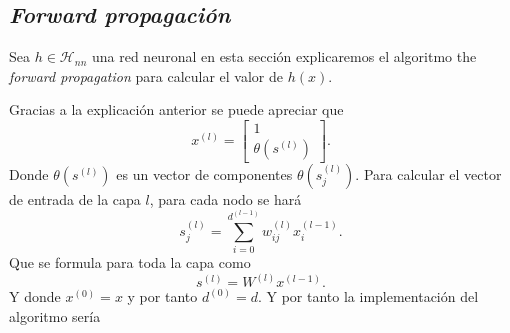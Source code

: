 \subsection{ \textit{Forward propagación}}
Sea $h \in \mathcal{H}_{n n}$ una red neuronal en esta sección explicaremos el algoritmo the \textit{forward propagation} para 
calcular el valor de $h(x).$

Gracias a la explicación anterior se puede apreciar que 
\begin{equation}
    x^{(l)} = 
    \left[ \begin{array}{c}
        1 \\
       \theta(s^{(l)})
        \end{array}
\right] .
\end{equation}
Donde $\theta(s^{(l)})$ es un vector de componentes $\theta(s^{(l)}_j)$. 
Para calcular el vector de entrada de la capa $l$, para cada nodo se hará
\begin{equation}
    s_j^{(l)} = \sum_{i=0}^{d^{(l-1)}} w_{i j}^{(l)}x_i^{(l-1)}.
\end{equation}
Que se formula para toda la capa como 
\begin{equation}
    s^{(l)} = W^{(l)} x^{(l-1)}.
\end{equation}
Y donde $x^{(0)} = x$ y por tanto $d^{(0)} = d.$
Y por tanto la implementación del algoritmo sería

